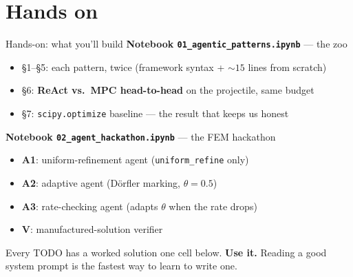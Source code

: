 \documentclass[aspectratio=169,10pt]{beamer}
\newcommand{\code}[1]{\texttt{\small #1}}
\newcommand{\hl}[1]{\textcolor{accent}{\textbf{#1}}}
\begin{document}
\section{Hands on}

\begin{frame}{Hands-on: what you'll build}
\textbf{Notebook \code{01\_agentic\_patterns.ipynb}} --- the zoo
\begin{itemize}\itemsep2pt\small
  \item \S1--\S5: each pattern, twice (framework syntax + ${\sim}15$ lines from scratch)
  \item \S6: \textbf{ReAct vs.\ MPC head-to-head} on the projectile, same budget
  \item \S7: \code{scipy.optimize} baseline --- the result that keeps us honest
\end{itemize}

\vspace{0.8em}
\textbf{Notebook \code{02\_agent\_hackathon.ipynb}} --- the FEM hackathon
\begin{itemize}\itemsep2pt\small
  \item \textbf{A1}: uniform-refinement agent (\code{uniform\_refine} only)
  \item \textbf{A2}: adaptive agent (Dörfler marking, $\theta = 0.5$)
  \item \textbf{A3}: rate-checking agent (adapts $\theta$ when the rate drops)
  \item \textbf{V}: manufactured-solution verifier
\end{itemize}

\vspace{0.8em}
\begin{center}
Every TODO has a worked solution one cell below. \hl{Use it.}
Reading a good system prompt is the fastest way to learn to write one.
\end{center}
\end{frame}
\end{document}
